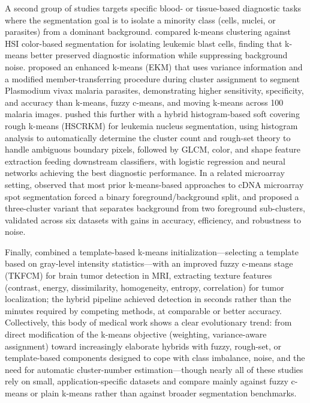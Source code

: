 A second group of studies targets specific blood- or tissue-based diagnostic tasks where the segmentation goal is to isolate a minority class (cells, nuclei, or parasites) from a dominant background. \cite{fatma2014leukemia} compared k-means clustering against HSI color-based segmentation for isolating leukemic blast cells, finding that k-means better preserved diagnostic information while suppressing background noise. \cite{nasir2018enhanced} proposed an enhanced k-means (EKM) that uses variance information and a modified member-transferring procedure during cluster assignment to segment Plasmodium vivax malaria parasites, demonstrating higher sensitivity, specificity, and accuracy than k-means, fuzzy c-means, and moving k-means across 100 malaria images. \cite{h2020leukemia} pushed this further with a hybrid histogram-based soft covering rough k-means (HSCRKM) for leukemia nucleus segmentation, using histogram analysis to automatically determine the cluster count and rough-set theory to handle ambiguous boundary pixels, followed by GLCM, color, and shape feature extraction feeding downstream classifiers, with logistic regression and neural networks achieving the best diagnostic performance. In a related microarray setting, \cite{wang2015improved} observed that most prior k-means-based approaches to cDNA microarray spot segmentation forced a binary foreground/background split, and proposed a three-cluster variant that separates background from two foreground sub-clusters, validated across six datasets with gains in accuracy, efficiency, and robustness to noise.

Finally, \cite{alam2019automatic} combined a template-based k-means initialization---selecting a template based on gray-level intensity statistics---with an improved fuzzy c-means stage (TKFCM) for brain tumor detection in MRI, extracting texture features (contrast, energy, dissimilarity, homogeneity, entropy, correlation) for tumor localization; the hybrid pipeline achieved detection in seconds rather than the minutes required by competing methods, at comparable or better accuracy. Collectively, this body of medical work shows a clear evolutionary trend: from direct modification of the k-means objective (weighting, variance-aware assignment) toward increasingly elaborate hybrids with fuzzy, rough-set, or template-based components designed to cope with class imbalance, noise, and the need for automatic cluster-number estimation---though nearly all of these studies rely on small, application-specific datasets and compare mainly against fuzzy c-means or plain k-means rather than against broader segmentation benchmarks.

